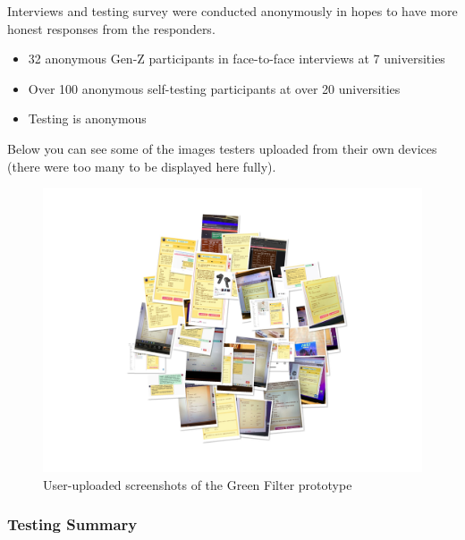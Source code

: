 \documentclass[
  12pt,
  letterpaper,
  DIV=11,
  numbers=noendperiod]{scrartcl}
\providecommand{\tightlist}{%
  \setlength{\itemsep}{0pt}\setlength{\parskip}{0pt}}
\begin{document}
Interviews and testing survey were conducted anonymously in hopes to
have more honest responses from the responders.

\begin{itemize}
\tightlist
\item
  32 anonymous Gen-Z participants in face-to-face interviews at 7
  universities
\item
  Over 100 anonymous self-testing participants at over 20 universities
\item
  Testing is anonymous
\end{itemize}

Below you can see some of the images testers uploaded from their own
devices (there were too many to be displayed here fully).

\begin{figure}[H]

{\centering \includegraphics[width=1\linewidth,height=\textheight,keepaspectratio]{./images/testing/user-screenshots-2.jpg}

}

\caption{User-uploaded screenshots of the Green Filter prototype}

\end{figure}%

\subsubsection{Testing Summary}\label{testing-summary}
\end{document}
